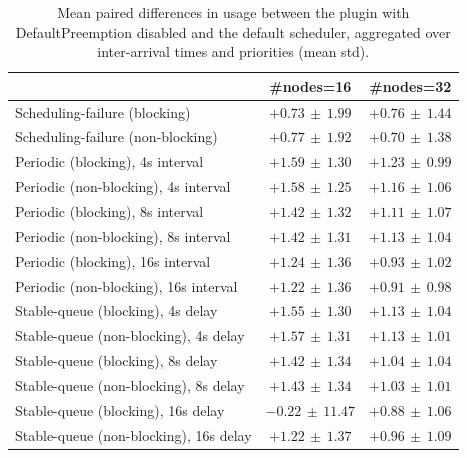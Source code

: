 \begin{table}[t]
\tiny
\setlength{\tabcolsep}{1.2pt}
\renewcommand{\arraystretch}{1.12}
\centering
\caption{Mean paired differences in usage between the plugin with DefaultPreemption disabled and the default scheduler, aggregated over inter-arrival times and priorities (mean \pm std).}
\label{tab:usage-defpreempt0-std1-agg-arrival-prio}
\begin{tabular}{l c c}
\toprule
 & \#nodes=16 & \#nodes=32 \\
\midrule
Scheduling-failure (blocking) & $+0.73\,\pm\,1.99$ & $+0.76\,\pm\,1.44$ \\
Scheduling-failure (non-blocking) & $+0.77\,\pm\,1.92$ & $+0.70\,\pm\,1.38$ \\
Periodic (blocking), 4s interval & $+1.59\,\pm\,1.30$ & $+1.23\,\pm\,0.99$ \\
Periodic (non-blocking), 4s interval & $+1.58\,\pm\,1.25$ & $+1.16\,\pm\,1.06$ \\
Periodic (blocking), 8s interval & $+1.42\,\pm\,1.32$ & $+1.11\,\pm\,1.07$ \\
Periodic (non-blocking), 8s interval & $+1.42\,\pm\,1.31$ & $+1.13\,\pm\,1.04$ \\
Periodic (blocking), 16s interval & $+1.24\,\pm\,1.36$ & $+0.93\,\pm\,1.02$ \\
Periodic (non-blocking), 16s interval & $+1.22\,\pm\,1.36$ & $+0.91\,\pm\,0.98$ \\
Stable-queue (blocking), 4s delay & $+1.55\,\pm\,1.30$ & $+1.13\,\pm\,1.04$ \\
Stable-queue (non-blocking), 4s delay & $+1.57\,\pm\,1.31$ & $+1.13\,\pm\,1.01$ \\
Stable-queue (blocking), 8s delay & $+1.42\,\pm\,1.34$ & $+1.04\,\pm\,1.04$ \\
Stable-queue (non-blocking), 8s delay & $+1.43\,\pm\,1.34$ & $+1.03\,\pm\,1.01$ \\
Stable-queue (blocking), 16s delay & $-0.22\,\pm\,11.47$ & $+0.88\,\pm\,1.06$ \\
Stable-queue (non-blocking), 16s delay & $+1.22\,\pm\,1.37$ & $+0.96\,\pm\,1.09$ \\
\bottomrule
\end{tabular}
\end{table}
